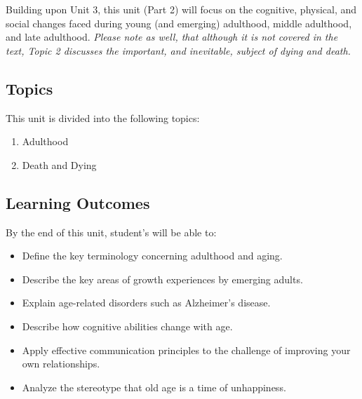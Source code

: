\documentclass[
]{book}
\providecommand{\tightlist}{%
  \setlength{\itemsep}{0pt}\setlength{\parskip}{0pt}}
\begin{document}
Building upon Unit 3, this unit (Part 2) will focus on the cognitive, physical, and social changes faced during young (and emerging) adulthood, middle adulthood, and late adulthood. \emph{Please note as well, that although it is not covered in the text, Topic 2 discusses the important, and inevitable, subject of dying and death.}

\hypertarget{topics-3}{%
\subsection*{Topics}\label{topics-3}}

This unit is divided into the following topics:

\begin{enumerate}
\def\labelenumi{\arabic{enumi}.}
\tightlist
\item
  Adulthood\\
\item
  Death and Dying
\end{enumerate}

\hypertarget{learning-outcomes-3}{%
\subsection*{Learning Outcomes}\label{learning-outcomes-3}}

By the end of this unit, student's will be able to:

\begin{itemize}
\tightlist
\item
  Define the key terminology concerning adulthood and aging.\\
\item
  Describe the key areas of growth experiences by emerging adults.\\
\item
  Explain age-related disorders such as Alzheimer's disease.\\
\item
  Describe how cognitive abilities change with age.\\
\item
  Apply effective communication principles to the challenge of improving your own relationships.\\
\item
  Analyze the stereotype that old age is a time of unhappiness.
\end{itemize}
\end{document}
